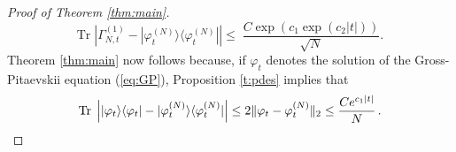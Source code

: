 \documentclass[11pt,a4paper]{article}
\newcommand{\tr}{\mbox{Tr}}
\newcommand{\cH}{{\cal H}}
\begin{document}
\begin{proof}[Proof of Theorem \ref{thm:main}]
\[  \tr \; \left| \Gamma^{(1)}_{N,t} - |\varphi^{(N)}_t \rangle \langle \varphi_t^{(N)}| \right| \leq \; \frac{C\exp (c_1 \exp (c_2 |t|))}{\sqrt{N}}. \]
Theorem \ref{thm:main} now follows because, if $\varphi_t$ denotes the solution of the Gross-Pitaevskii equation (\ref{eq:GP}), Proposition \ref{t:pdes} implies that
\[ \tr \; \left| |\varphi_t \rangle \langle \varphi_t| -  |\varphi^{(N)}_t \rangle \langle \varphi^{(N)}_t| \right| \leq 2 \| \varphi_t - \varphi_t^{(N)} \|_2 \leq \frac{C e^{c_1 |t|}}{N} \, .\qedhere \]
\end{proof}

\end{document}
